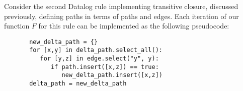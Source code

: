 Consider the second Datalog rule implementing transitive closure, discussed previously, defining paths in terms of paths and edges. Each iteration of our function $F$ for this rule can be implemented as the following pseudocode:

\begin{verbatim}
       new_delta_path = {}
       for [x,y] in delta_path.select_all():
          for [y,z] in edge.select("y", y):
             if path.insert([x,z]) == true:
                new_delta_path.insert([x,z])
       delta_path = new_delta_path   
\end{verbatim}



